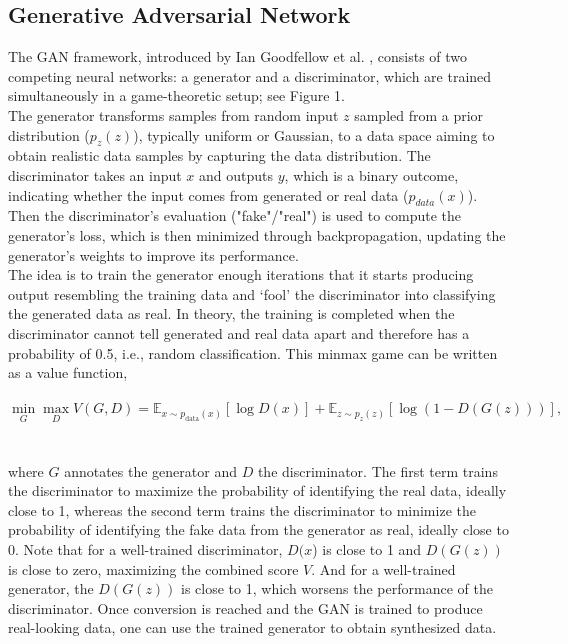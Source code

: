 \documentclass[review,12pt]{elsarticle}
\begin{document}
\subsection{Generative Adversarial Network}
The GAN framework, introduced by Ian Goodfellow et al. \cite{goodfellow2014generativeadversarialnetworks}, consists of two competing neural networks: a generator and a discriminator, which are trained simultaneously in a game-theoretic setup; see Figure 1. 
\\%
The generator transforms samples from random input $z$ sampled from a prior distribution ($p_z(z)$), typically uniform or Gaussian, to a data space aiming to obtain realistic data samples by capturing the data distribution. The discriminator takes an input $x$ and outputs $y$, which is a binary outcome, indicating whether the input comes from generated or real data ($p_{data}(x)$). Then the discriminator’s evaluation ("fake"/"real") is used to compute the generator’s loss, which is then minimized through backpropagation, updating the generator's weights to improve its performance. 
\\The idea is to train the generator enough iterations that it starts producing output resembling the training data and ‘fool’ the discriminator into classifying the generated data as real. In theory, the training is completed when the discriminator cannot tell generated and real data apart and therefore has a probability of 0.5, i.e., random classification. This minmax game can be written as a value function,
\\
\\
\begin{equation} 
\min_G \max_D V(G, D) = \mathbb{E}_{x \sim p_{\text{data}}(x)} \left[ \log D(x) \right] + \mathbb{E}_{z \sim p_z(z)} \left[ \log \left( 1 - D(G(z)) \right) \right],
\end{equation}
\\
\\
where $G$ annotates the generator and $D$ the discriminator. The first term trains the discriminator to maximize the probability of identifying the real data, ideally close to 1, whereas the second term trains the discriminator to minimize the probability of identifying the fake data from the generator as real, ideally close to 0. 
Note that for a well-trained discriminator, $D(x$) is close to 1 and $D(G(z))$ is close to zero, maximizing the combined score $V$. And for a well-trained generator, the $D(G(z))$ is close to 1, which worsens the performance of the discriminator.
Once conversion is reached and the GAN is trained to produce real-looking data, one can use the trained generator to obtain synthesized data. 
\\
\end{document}
